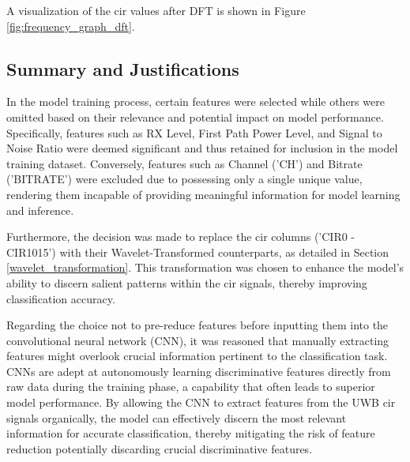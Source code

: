 A visualization of the \gls{cir} values after DFT is shown in Figure \ref{fig:frequency_graph_dft}.

\subsection{Summary and Justifications}

In the model training process, certain features were selected while others were omitted based on their relevance and potential impact on model performance. Specifically, features such as RX Level, First Path Power Level, and Signal to Noise Ratio were deemed significant and thus retained for inclusion in the model training dataset. Conversely, features such as Channel ('CH') and Bitrate ('BITRATE') were excluded due to possessing only a single unique value, rendering them incapable of providing meaningful information for model learning and inference.

Furthermore, the decision was made to replace the \gls{cir} columns ('CIR0 - CIR1015') with their Wavelet-Transformed counterparts, as detailed in Section \ref{wavelet_transformation}. This transformation was chosen to enhance the model's ability to discern salient patterns within the \gls{cir} signals, thereby improving classification accuracy.

Regarding the choice not to pre-reduce features before inputting them into the convolutional neural network (CNN), it was reasoned that manually extracting features might overlook crucial information pertinent to the classification task. CNNs are adept at autonomously learning discriminative features directly from raw data during the training phase, a capability that often leads to superior model performance. By allowing the CNN to extract features from the UWB \gls{cir} signals organically, the model can effectively discern the most relevant information for accurate classification, thereby mitigating the risk of feature reduction potentially discarding crucial discriminative features.

